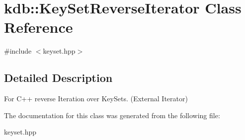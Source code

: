 \hypertarget{classkdb_1_1KeySetReverseIterator}{\section{kdb\-:\-:Key\-Set\-Reverse\-Iterator Class Reference}
\label{classkdb_1_1KeySetReverseIterator}
}


{\ttfamily \#include $<$keyset.\-hpp$>$}



\subsection{Detailed Description}
For C++ reverse Iteration over Key\-Sets. (External Iterator) 

The documentation for this class was generated from the following file\-:\begin{DoxyCompactItemize}
\item 
keyset.\-hpp\end{DoxyCompactItemize}
